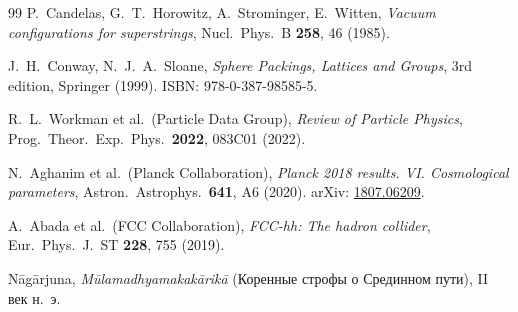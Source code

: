 \documentclass[11pt,a4paper]{article}
\theoremstyle{definition}
\begin{document}
\begin{thebibliography}{99}
P.~Candelas, G.~T.~Horowitz, A.~Strominger, E.~Witten,
\textit{Vacuum configurations for superstrings},
Nucl.\ Phys.\ B \textbf{258}, 46 (1985).

J.~H.~Conway, N.~J.~A.~Sloane,
\textit{Sphere Packings, Lattices and Groups},
3rd edition, Springer (1999).
ISBN: 978-0-387-98585-5.

R.~L.~Workman et al.\ (Particle Data Group),
\textit{Review of Particle Physics},
Prog.\ Theor.\ Exp.\ Phys.\ \textbf{2022}, 083C01 (2022).

N.~Aghanim et al.\ (Planck Collaboration),
\textit{Planck 2018 results. VI. Cosmological parameters},
Astron.\ Astrophys.\ \textbf{641}, A6 (2020).
arXiv: \href{https://arxiv.org/abs/1807.06209}{1807.06209}.

A.~Abada et al.\ (FCC Collaboration),
\textit{FCC-hh: The hadron collider},
Eur.\ Phys.\ J.\ ST \textbf{228}, 755 (2019).

N\=ag\=arjuna,
\textit{M\=ulamadhyamakak\=arik\=a} (Коренные строфы о Срединном пути),
II век н.~э.

\end{thebibliography}


\newpage

\vspace*{2cm}
\end{document}
